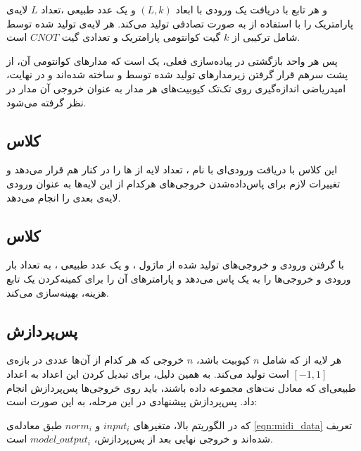 و هر تابع 
با دریافت یک ورودی با ابعاد
$(L, k)$
و یک عدد طبیعی
،تعداد
$L$
لایه‌ی پارامتریک را با استفاده از
به صورت تصادفی تولید می‌کند.
هر لایه‌ی تولید شده توسط
شامل ترکیبی از 
$k$
گیت کوانتومی پارامتریک و تعدادی گیت 
$CNOT$
است.

پس هر واحد بازگشتی در پیاده‌سازی فعلی، یک
است که مدارهای کوانتومی آن، از پشت سرهم قرار گرفتن زیرمدارهای تولید شده توسط
و
ساخته شده‌اند و در نهایت، امیدریاضی اندازه‌گیری روی تک‌تک کیوبیت‌های هر مدار به عنوان خروجی آن مدار در نظر گرفته می‌شود.

\subsection{
کلاس
}
این کلاس با دریافت ورودی‌ای با نام
،
تعداد
لایه از 
ها را در کنار هم قرار می‌دهد و تغییرات لازم برای پاس‌داده‌شدن خروجی‌های هرکدام از این لایه‌ها به عنوان ورودی لایه‌ی بعدی را انجام می‌دهد.

\subsection{
کلاس
}
با گرفتن ورودی و خروجی‌های تولید شده از ماژول
،
و یک عدد طبیعی
،
به تعداد
بار
ورودی و خروجی‌ها را به یک 
پاس می‌دهد و پارامترهای آن را برای کمینه‌کردن یک تابع هزینه، بهینه‌سازی می‌کند.

\subsection{پس‌پردازش} \label{sec:qlstm_post}
هر لایه از
که شامل
$n$
کیوبیت باشد، 
$n$
خروجی که هر کدام از آن‌ها عددی در بازه‌ی
$[-1, 1]$
است تولید می‌کند. به همین دلیل، برای تبدیل کردن این اعداد به اعداد طبیعی‌ای که معادل نت‌های مجموعه داده باشند، باید روی خروجی‌ها پس‌پردازش انجام داد.
پس‌پردازش پیشنهادی در این مرحله، به این صورت است:

که در الگوریتم بالا، متغیرهای
$input_i$
و
$norm_i$
طبق معادله‌ی
\ref{eqn:midi_data}
تعریف شده‌اند و خروجی نهایی بعد از پس‌پردازش،
$model\_output_i$
است.



